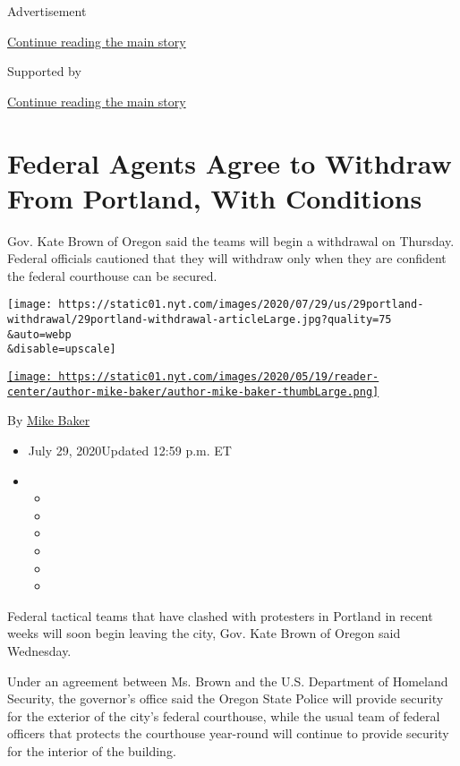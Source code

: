 Advertisement

\protect\hyperlink{after-top}{Continue reading the main story}

Supported by

\protect\hyperlink{after-sponsor}{Continue reading the main story}

\hypertarget{federal-agents-agree-to-withdraw-from-portland-with-conditions}{%
\section{Federal Agents Agree to Withdraw From Portland, With
Conditions}\label{federal-agents-agree-to-withdraw-from-portland-with-conditions}}

Gov. Kate Brown of Oregon said the teams will begin a withdrawal on
Thursday. Federal officials cautioned that they will withdraw only when
they are confident the federal courthouse can be secured.

\texttt{[image: https://static01.nyt.com/images/2020/07/29/us/29portland-withdrawal/29portland-withdrawal-articleLarge.jpg?quality=75\\\&auto=webp\\\&disable=upscale]}

\href{https://www.nytimes.com/by/mike-baker}{\texttt{[image: https://static01.nyt.com/images/2020/05/19/reader-center/author-mike-baker/author-mike-baker-thumbLarge.png]}}

By \href{https://www.nytimes.com/by/mike-baker}{Mike Baker}

\begin{itemize}
\item
  July 29, 2020Updated 12:59 p.m. ET
\item
  \begin{itemize}
  \item
  \item
  \item
  \item
  \item
  \item
  \end{itemize}
\end{itemize}

Federal tactical teams that have clashed with protesters in Portland in
recent weeks will soon begin leaving the city, Gov. Kate Brown of Oregon
said Wednesday.

Under an agreement between Ms. Brown and the U.S. Department of Homeland
Security, the governor's office said the Oregon State Police will
provide security for the exterior of the city's federal courthouse,
while the usual team of federal officers that protects the courthouse
year-round will continue to provide security for the interior of the
building.

